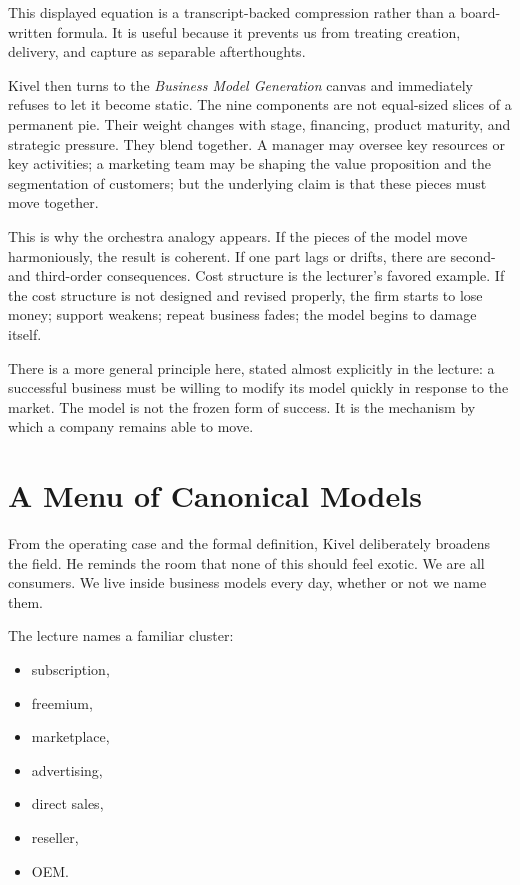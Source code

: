 \begin{remark}
This displayed equation is a transcript-backed compression rather than a board-written formula. It is useful because it prevents us from treating creation, delivery, and capture as separable afterthoughts.
\end{remark}

Kivel then turns to the \emph{Business Model Generation} canvas and immediately refuses to let it become static. The nine components are not equal-sized slices of a permanent pie. Their weight changes with stage, financing, product maturity, and strategic pressure. They blend together. A manager may oversee key resources or key activities; a marketing team may be shaping the value proposition and the segmentation of customers; but the underlying claim is that these pieces must move together.

This is why the orchestra analogy appears. If the pieces of the model move harmoniously, the result is coherent. If one part lags or drifts, there are second- and third-order consequences. Cost structure is the lecturer's favored example. If the cost structure is not designed and revised properly, the firm starts to lose money; support weakens; repeat business fades; the model begins to damage itself.

There is a more general principle here, stated almost explicitly in the lecture: a successful business must be willing to modify its model quickly in response to the market. The model is not the frozen form of success. It is the mechanism by which a company remains able to move.

\section{A Menu of Canonical Models}

From the operating case and the formal definition, Kivel deliberately broadens the field. He reminds the room that none of this should feel exotic. We are all consumers. We live inside business models every day, whether or not we name them.

The lecture names a familiar cluster:
\begin{itemize}
\item subscription,
\item freemium,
\item marketplace,
\item advertising,
\item direct sales,
\item reseller,
\item OEM.
\end{itemize}

